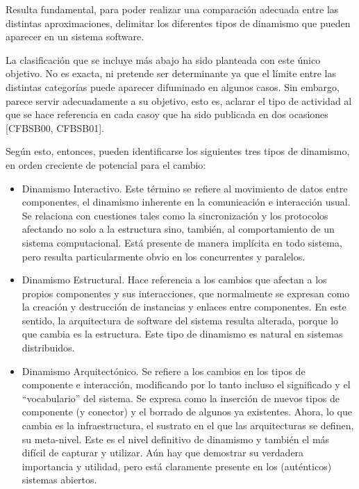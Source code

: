 Resulta fundamental, para poder realizar una comparación adecuada entre las
distintas aproximaciones, delimitar los diferentes tipos de dinamismo que
pueden aparecer en un sistema software.

La clasificación que se incluye más abajo ha sido planteada con este único
objetivo. No es exacta, ni pretende ser determinante ya que el límite entre las
distintas categorías puede aparecer difuminado en algunos casos. Sin
embargo, parece servir adecuadamente a su objetivo, esto es,
aclarar el tipo de actividad al que se hace referencia en cada casoy que ha
sido publicada en dos ocasiones [CFBSB00, CFBSB01].

Según esto, entonces, pueden identificarse los siguientes tres tipos de
dinamismo, en orden creciente de potencial para el cambio:

\begin{itemize}
\item 
Dinamismo Interactivo. Este término se refiere al movimiento de datos
entre componentes, el dinamismo inherente en la comunicación e interacción
usual. Se relaciona con cuestiones tales como la sincronización y los
protocolos afectando no solo a la estructura sino, también, al comportamiento de un sistema
computacional. Está presente de manera implícita en todo sistema, pero resulta
particularmente obvio en los concurrentes y paralelos.

\item
Dinamismo Estructural. Hace referencia a los cambios que afectan a los propios
componentes y sus interacciones, que normalmente se expresan como la creación
y destrucción de instancias y enlaces entre componentes. En este sentido, la
arquitectura de software del sistema resulta alterada, porque lo que cambia es
la estructura. Este tipo de dinamismo es natural en sistemas distribuidos.


\item 
Dinamismo Arquitectónico. Se refiere a los cambios en los tipos de
componente e interacción, modificando por lo tanto incluso el significado y el 
“vocabulario” del sistema. Se expresa como la inserción de nuevos tipos de
componente (y conector) y el borrado de algunos ya existentes. Ahora, lo que
cambia es la infraestructura, el sustrato en el que las arquitecturas se
definen, su meta-nivel. Este es el nivel definitivo de dinamismo y también el
más difícil de capturar y utilizar. Aún hay que demostrar su verdadera
importancia y utilidad, pero está claramente presente en los (auténticos)
sistemas abiertos.

\end{itemize}
